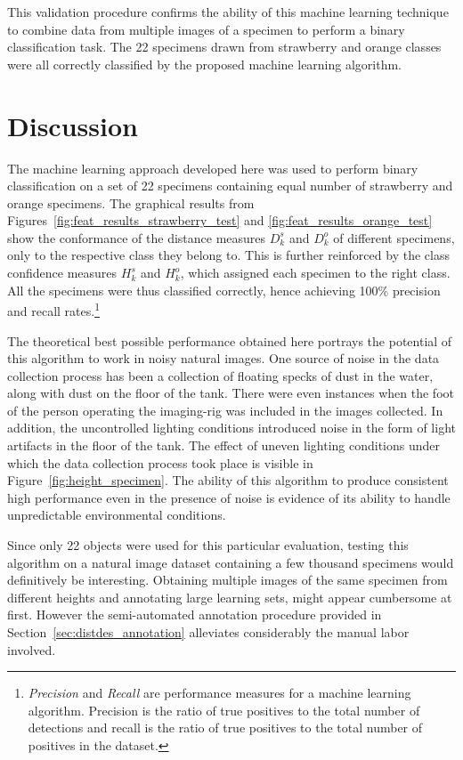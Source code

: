 This validation procedure confirms the ability of this machine learning technique to combine data from multiple images of a specimen to perform a binary classification task. The 22 specimens drawn from strawberry and orange classes were all correctly classified by the proposed machine learning algorithm.

\section{Discussion}

The machine learning approach developed here was used to perform binary classification on a set of 22 specimens containing equal number of strawberry and orange specimens. The graphical results from Figures~\ref{fig:feat_results_strawberry_test} and \ref{fig:feat_results_orange_test} show the conformance of the distance measures $D^s_k$ and $D^o_k$ of different specimens, only to the respective class they belong to. This is further reinforced by the class confidence measures $H^s_k$ and $H^o_k$, which assigned each specimen to the right class. All the specimens were thus classified correctly, hence achieving 100\% precision and recall rates.\footnote{\emph{Precision} and \emph{Recall} are performance measures for a machine learning algorithm. Precision is the ratio of true positives to the total number of detections and recall is the ratio of true positives to the total number of positives in the dataset.} 

The theoretical best possible performance obtained here portrays the potential of this algorithm to work in noisy natural images. One source of noise in the data collection process has been a collection of floating specks of dust in the water, along with dust on the floor of the tank. There were even instances when the foot of the person operating the imaging-rig was included in the images collected. In addition, the uncontrolled lighting conditions introduced noise in the form of light artifacts in the floor of the tank. The effect of uneven lighting conditions under which the data collection process took place is visible in Figure~\ref{fig:height_specimen}. The ability of this algorithm to produce consistent high performance even in the presence of noise is evidence of its ability to handle unpredictable environmental conditions.

Since only 22 objects were used for this particular evaluation, testing this algorithm on a natural image dataset containing a few thousand specimens would definitively be interesting. Obtaining multiple images of the same specimen from different heights and annotating large learning sets, might appear cumbersome at first. However the semi-automated annotation procedure provided in Section~\ref{sec:distdes_annotation} alleviates considerably the manual labor involved.

